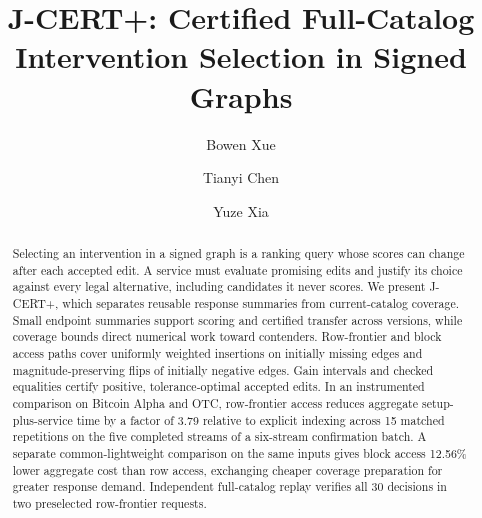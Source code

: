 \documentclass[sigconf,nonacm]{acmart}
\begin{document}
\title[J-CERT+: Certified Full-Catalog Intervention Selection in Signed Graphs]{J-CERT+: Certified Full-Catalog\texorpdfstring{\\}{ }Intervention Selection in Signed Graphs}
\author{Bowen Xue}
\author{Tianyi Chen}
\author{Yuze Xia}
\renewcommand{\shortauthors}{Xue et al.}

\begin{abstract}
Selecting an intervention in a signed graph is a ranking query whose scores can change after each accepted edit. A service must evaluate promising edits and justify its choice against every legal alternative, including candidates it never scores. We present J-CERT+, which separates reusable response summaries from current-catalog coverage. Small endpoint summaries support scoring and certified transfer across versions, while coverage bounds direct numerical work toward contenders. Row-frontier and block access paths cover uniformly weighted insertions on initially missing edges and magnitude-preserving flips of initially negative edges. Gain intervals and checked equalities certify positive, tolerance-optimal accepted edits. In an instrumented comparison on Bitcoin Alpha and OTC, row-frontier access reduces aggregate setup-plus-service time by a factor of 3.79 relative to explicit indexing across 15 matched repetitions on the five completed streams of a six-stream confirmation batch. A separate common-lightweight comparison on the same inputs gives block access 12.56\% lower aggregate cost than row access, exchanging cheaper coverage preparation for greater response demand. Independent full-catalog replay verifies all 30 decisions in two preselected row-frontier requests.
\end{abstract}

\maketitle
\vldbtopmatter











\end{document}
